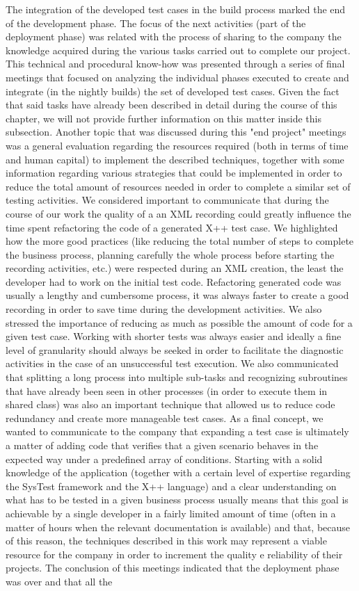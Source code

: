 The integration of the developed test cases in the build process marked the end of the development phase. The focus of the next activities (part of the deployment phase) was related with the process of sharing to the company the knowledge acquired during the various tasks carried out to complete our project. This technical and procedural know-how was presented through a series of final meetings that focused on analyzing the individual phases executed to create and integrate (in the nightly builds) the set of developed test cases. Given the fact that said tasks have already been described in detail during the course of this chapter, we will not provide further information on this matter inside this subsection. Another topic that was discussed during this "end project" meetings was a general evaluation regarding the resources required (both in terms of time and human capital) to implement the described techniques, together with some information regarding various strategies that could be implemented in order to reduce the total amount of resources needed in order to complete a similar set of testing activities. We considered important to communicate that during the course of our work the quality of a an XML recording could greatly influence the time spent refactoring the code of a generated X++ test case. We highlighted how the more good practices (like reducing the total number of steps to complete the business process, planning carefully the whole process before starting the recording activities, etc.) were respected during an XML creation, the least the developer had to work on the initial test code. Refactoring generated code was usually a lengthy and cumbersome process, it was always faster to create a good recording in order to save time during the development activities. We also stressed the importance of reducing as much as possible the amount of code for a given test case. Working with shorter tests was always easier and ideally a fine level of granularity should always be seeked in order to facilitate the diagnostic activities in the case of an unsuccessful test execution. We also communicated that splitting a long process into multiple sub-tasks and recognizing subroutines that have already been seen in other processes (in order to execute them in shared class) was also an important technique that allowed us to reduce code redundancy and create more manageable test cases. As a final concept, we wanted to communicate to the company that expanding a test case is ultimately a matter of adding code that verifies that a given scenario behaves in the expected way under a predefined array of conditions. Starting with a solid knowledge of the application (together with a certain level of expertise regarding the SysTest framework and the X++ language) and a clear understanding on what has to be tested in a given business process usually means that this goal is achievable by a single developer in a fairly limited amount of time (often in a matter of hours when the relevant documentation is available) and that, because of this reason, the  techniques described in this work may represent a viable resource for the company in order to increment the quality e reliability of their projects. The conclusion of this meetings indicated that the deployment phase was over and that all the 